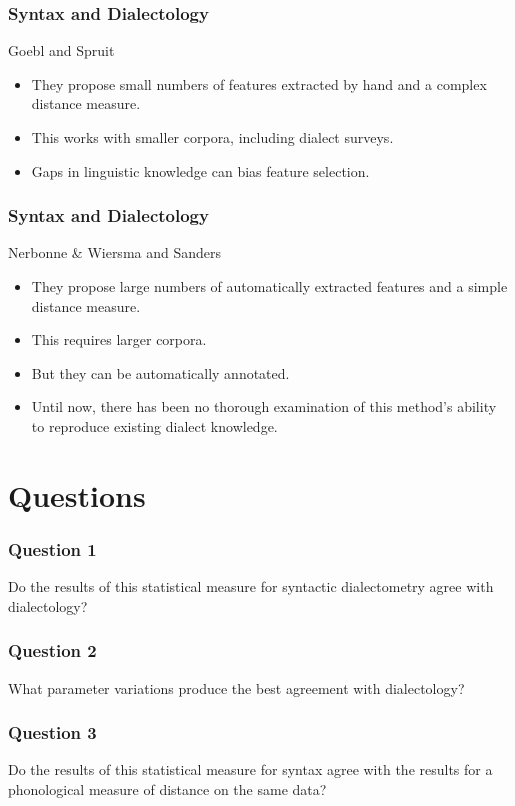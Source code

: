 \documentclass{beamer}
\begin{document}
\begin{frame}
  \frametitle{Syntax and Dialectology}
  Goebl and Spruit
\begin{itemize}
\item They propose small numbers of features extracted by hand and a
  complex distance measure.
\item This works with smaller corpora, including dialect surveys.
\item Gaps in linguistic knowledge can bias feature selection.
\end{itemize}
\end{frame}

\begin{frame}
  \frametitle{Syntax and Dialectology}
  Nerbonne \& Wiersma and Sanders
\begin{itemize}
\item They propose large numbers of automatically extracted features
  and a simple distance measure.
\item This requires larger corpora.
\item But they can be automatically annotated.
\item Until now, there has been no thorough examination of this
  method's ability to reproduce existing dialect knowledge.
\end{itemize}
\end{frame}

\section{Questions}
\begin{frame}
 \frametitle{Question 1}

Do the results of this statistical measure for syntactic dialectometry
agree with dialectology?

\end{frame}

\begin{frame}
  \frametitle{Question 2}
 What parameter variations produce the best agreement with
  dialectology?
\end{frame}

\begin{frame}
  \frametitle{Question 3}
 Do the results of this statistical measure for syntax agree with the
  results for a phonological measure of distance on the same data?
\end{frame}
\end{document}
